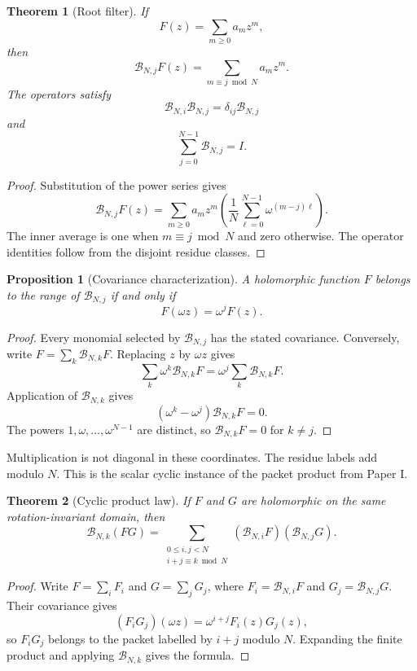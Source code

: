 \documentclass[11pt,letterpaper]{article}
\newtheorem{theorem}{Theorem}[section]
\newtheorem{proposition}[proposition]{Proposition}
\theoremstyle{definition}
\theoremstyle{remark}
\newcommand{\Bcal}{\mathcal B}
\begin{document}
\begin{theorem}[Root filter]\label{thm:root_filter}
If
\[
F(z)=\sum_{m\geq0}a_mz^m,
\]
then
\[
\Bcal_{N,j}F(z)
=
\sum_{m\equiv j\bmod N}a_mz^m.
\]
The operators satisfy
\[
\Bcal_{N,i}\Bcal_{N,j}=\delta_{ij}\Bcal_{N,j}
\]
and
\[
\sum_{j=0}^{N-1}\Bcal_{N,j}=I.
\]
\end{theorem}

\begin{proof}
Substitution of the power series gives
\[
\Bcal_{N,j}F(z)
=
\sum_{m\geq0}a_mz^m
\left(
\frac1N\sum_{\ell=0}^{N-1}\omega^{(m-j)\ell}
\right).
\]
The inner average is one when $m\equiv j\bmod N$ and zero otherwise.  The operator identities follow from the disjoint residue classes.
\end{proof}

\begin{proposition}[Covariance characterization]\label{prop:covariance}
A holomorphic function $F$ belongs to the range of $\Bcal_{N,j}$ if and only if
\[
F(\omega z)=\omega^jF(z).
\]
\end{proposition}

\begin{proof}
Every monomial selected by $\Bcal_{N,j}$ has the stated covariance.  Conversely, write $F=\sum_k\Bcal_{N,k}F$.  Replacing $z$ by $\omega z$ gives
\[
\sum_k\omega^k\Bcal_{N,k}F
=
\omega^j\sum_k\Bcal_{N,k}F.
\]
Application of $\Bcal_{N,k}$ gives
\[
(\omega^k-\omega^j)\Bcal_{N,k}F=0.
\]
The powers $1,\omega,\ldots,\omega^{N-1}$ are distinct, so
$\Bcal_{N,k}F=0$ for $k\ne j$.
\end{proof}

Multiplication is not diagonal in these coordinates. The residue labels add
modulo $N$. This is the scalar cyclic instance of the packet product from
Paper I.

\begin{theorem}[Cyclic product law]\label{thm:cyclic_product}
If $F$ and $G$ are holomorphic on the same rotation-invariant domain, then
\[
\Bcal_{N,k}(FG)
=
\sum_{\substack{0\leq i,j<N\\ i+j\equiv k\bmod N}}
(\Bcal_{N,i}F)(\Bcal_{N,j}G).
\]
\end{theorem}

\begin{proof}
Write $F=\sum_iF_i$ and $G=\sum_jG_j$, where
$F_i=\Bcal_{N,i}F$ and $G_j=\Bcal_{N,j}G$.  Their covariance gives
\[
(F_iG_j)(\omega z)=\omega^{i+j}F_i(z)G_j(z),
\]
so $F_iG_j$ belongs to the packet labelled by $i+j$ modulo $N$.
Expanding the finite product and applying $\Bcal_{N,k}$ gives the formula.
\end{proof}
\end{document}
